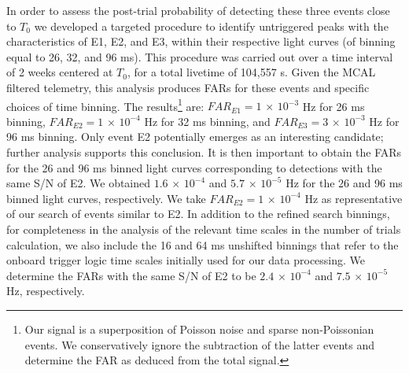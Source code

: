 \documentclass[preprint2]{aastex}
\def \fv {}
\def \fvv {}
\def \fvvv {}
\def \fvr {}
\begin{document}
In order to assess the post-trial probability of detecting these
three events close to $T_0$ we developed a targeted procedure to
identify untriggered peaks with the characteristics of E1, E2, and E3, {\fvv within} their respective
light curves (of binning equal to 26, 32, and 96 ms).
This procedure was carried out over a time interval of 2 weeks centered at $T_0${\fvv , for a total livetime of 104,557 s}.
Given the MCAL filtered telemetry, this analysis produces FARs for these events
and specific choices of time binning. The results\footnote[4]{{\fvvv Our signal is a superposition of Poisson noise and sparse non-Poissonian events. We conservatively ignore the subtraction of the latter events and determine the FAR as deduced from the total signal.}} are:
 $FAR_{E1} = 1\,\times\,10^{-3}$ Hz for 26 ms binning, $FAR_{E2} = 1\,\times\,10^{-4}$
 Hz for 32 ms binning, and $FAR_{E3} = 3\,\times\,10^{-3}$ Hz for 96 ms binning.
{\fvv Only e}vent E2 {\fv potentially} emerges as an interesting candidate; further
analysis supports this conclusion. {\fvvv It is then important to obtain the FARs for the 26 and 96 ms binned light curves corresponding to detections with the same S/N of E2. We obtained ${\fvvv 1.6\,\times\, 10^{-4}}$ and ${\fvvv 5.7\,\times\, 10^{-5}}$ Hz for the 26 and 96 ms binned light curves, respectively.}
%
{\fvvv We take ${\fvvv FAR_{E2} = 1\,\times\,10^{-4}}$ Hz as representative of our search of events similar to E2.} {\fvr In addition to the refined search binnings, for completeness in the analysis of the relevant time scales in the number of trials calculation, we also include the 16 and 64 ms unshifted binnings that refer to the onboard trigger logic time scales initially used for our data processing. We determine the FARs with the same S/N of E2 to be ${\fvr 2.4\,\times\, 10^{-4}}$ and ${\fvr 7.5\,\times\, 10^{-5}}$ Hz, respectively.}
\end{document}
